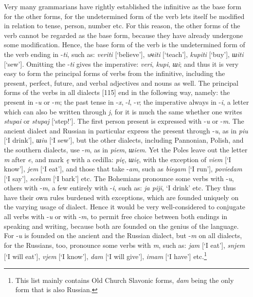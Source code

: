 Very many grammarians have rightly established the infinitive as the base form for the other forms, for the undetermined form of the verb lets itself be modified in relation to tense, person, number etc. For this reason, the other forms of the verb cannot be regarded as the base form, because they have already undergone some modification. Hence, the base form of the verb is the undetermined form of the verb ending in -\textit{ti}, such as: \textit{veriti} [‘believe’], \textit{uчiti} [‘teach’], \textit{kupiti} [‘buy’], \textit{шiti} [‘sew’]. Omitting the -\textit{ti} gives the imperative: \textit{veri}, \textit{kupi}, \textit{шi}; and thus it is very easy to form the principal forms of verbs from the infinitive, including the present, perfect, future, and verbal adjectives and nouns as well. The principal forms of the verbs in all dialects [115] end in the following way, namely: the present in -\textit{u} or -\textit{m}; the past tense in -\textit{x}, -\textit{l}, -\textit{v}; the imperative always in -\textit{i}, a letter which can also be written through \textit{j}, for it is much the same whether one writes \textit{stupai} or \textit{stupaj} [‘step!’]. The first person present is expressed with -\textit{u} or -\textit{m}. The ancient dialect and Russian in particular express the present through -\textit{u}, as in \textit{piu} [‘I drink’], \textit{шiu} [‘I sew’], but the other dialects, including Pannonian, Polish, and the southern dialects, use -\textit{m}, as in \textit{piem}, \textit{шiem}. Yet the Poles leave out the letter \textit{m} after \textit{e}, and mark \textit{ę} with a cedilla: \textit{pię}, \textit{шię}, with the exception of \textit{viem} [‘I know’], \textit{jem} [‘I eat’], and those that take -\textit{am}, such as \textit{biegam} [‘I run’], \textit{poviedam} [‘I say’], \textit{scekam} [‘I bark’] etc. The Bohemians pronounce some verbs with -\textit{u}, others with -\textit{m}, a few entirely with -\textit{i}, such as: \textit{ja piji}, ‘I drink’ etc. They thus have their own rules burdened with exceptions, which are founded uniquely on the varying usage of dialect. Hence it would be very well-considered to conjugate all verbs with -\textit{u} or with -\textit{m}, to permit free choice between both endings in speaking and writing, because both are founded on the genius of the language. For -\textit{u} is founded on the ancient and the Russian dialect, but -\textit{m} on all dialects, for the Russians, too, pronounce some verbs with \textit{m}, such as: \textit{jam} [‘I eat’], \textit{snjem} [‘I will eat’], \textit{vjem} [‘I know’], \textit{dam} [‘I will give’], \textit{imam} [‘I have’] etc.\footnote{This list mainly contains Old Church Slavonic forms, \textit{dam} being the only form that is also Russian.}

